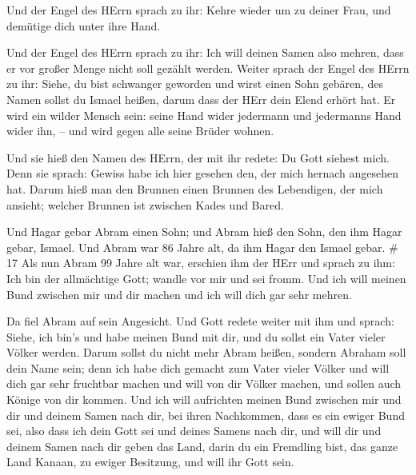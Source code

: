  Und der Engel des HErrn sprach zu ihr: Kehre wieder um zu
deiner Frau, und demütige dich unter ihre Hand.

 Und der Engel des HErrn sprach zu ihr: Ich will deinen
Samen also mehren, dass er vor großer Menge nicht soll gezählt werden.
 Weiter sprach der Engel des HErrn zu ihr: Siehe, du bist
schwanger geworden und wirst einen Sohn gebären, des Namen sollst du
Ismael heißen, darum dass der HErr dein Elend erhört hat. 
Er wird ein wilder Mensch sein: seine Hand wider jedermann und
jedermanns Hand wider ihn, -- und wird gegen alle seine Brüder wohnen.

 Und sie hieß den Namen des HErrn, der mit ihr redete: Du
Gott siehest mich. Denn sie sprach: Gewiss habe ich hier gesehen den,
der mich hernach angesehen hat.  Darum hieß man den Brunnen
einen Brunnen des Lebendigen, der mich ansieht; welcher Brunnen ist
zwischen Kades und Bared.

 Und Hagar gebar Abram einen Sohn; und Abram hieß den Sohn,
den ihm Hagar gebar, Ismael.  Und Abram war 86 Jahre alt,
da ihm Hagar den Ismael gebar. \# 17  Als nun Abram 99 Jahre
alt war, erschien ihm der HErr und sprach zu ihm: Ich bin der
allmächtige Gott; wandle vor mir und sei fromm.  Und ich
will meinen Bund zwischen mir und dir machen und ich will dich gar sehr
mehren.

 Da fiel Abram auf sein Angesicht. Und Gott redete weiter
mit ihm und sprach:  Siehe, ich bin's und habe meinen Bund
mit dir, und du sollst ein Vater vieler Völker werden. 
Darum sollst du nicht mehr Abram heißen, sondern Abraham soll dein Name
sein; denn ich habe dich gemacht zum Vater vieler Völker 
und will dich gar sehr fruchtbar machen und will von dir Völker machen,
und sollen auch Könige von dir kommen.  Und ich will
aufrichten meinen Bund zwischen mir und dir und deinem Samen nach dir,
bei ihren Nachkommen, dass es ein ewiger Bund sei, also dass ich dein
Gott sei und deines Samens nach dir,  und will dir und
deinem Samen nach dir geben das Land, darin du ein Fremdling bist, das
ganze Land Kanaan, zu ewiger Besitzung, und will ihr Gott sein.

